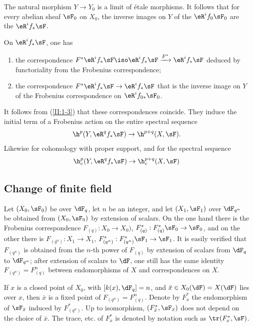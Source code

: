 \documentclass[oneside]{book}
\begin{document}
The natural morphism $Y\to Y_0$ is a limit of étale morphisms. It follows
that for every abelian sheaf $\sF_0$ on $X_0$, the inverse images on $Y$ of
the $\eR^if_0\sF_0$ are the $\eR^if_*\sF$.

On $\eR^if_*\sF$, one has
\begin{enumerate}[\indent a)]
  \item the correspondence
    $F^*\eR^i f_*\sF \iso \eR^i f_*\sF \xrightarrow{F^*} \eR^if_*\sF$
    deduced by functoriality from the Frobenius correspondence;
  \item the correspondence $F^*\eR^if_*\sF\to\eR^if_*\sF$ that is the
    inverse image on $Y$ of the Frobenius correspondence on
    $\eR^i f_{0*}\sF_0$.
\end{enumerate}

It follows from (\ref{II:1-3}) that these correspondences coincide. They
induce the initial term of a Frobenius action on the entire spectral sequence
\[
  \h^p(Y,\eR^q f_*\sF) \rightarrow \h^{p+q}(X,\sF) \text{.}
\]
Likewise for cohomology with proper support, and for the spectral sequence
\[
  \h_c^p(Y,\eR^q f_* \sF) \rightarrow \h_c^{p+q}(X,\sF)
\]





\subsection{Change of finite field}\label{II:1-5}

Let $(X_0,\sF_0)$ be over $\dF_q$, let $n$ be an integer, and let
$(X_1,\sF_1)$ over $\dF_{q^n}$ be obtained from $(X_0,\sF_0)$ by extension of
scalars. On the one hand there is the Frobenius correspondence
$F_{(q)}:X_0\to X_0)$, $F_{(q)}^*:F_{(q)}^*\sF_0\to \sF_0$, and on the other
there is $F_{(q^n)}:X_1\to X_1$,
$F_{(q^n)}^*:F_{(q^n)}^*\sF_1\to\sF_1$. It is easily verified that
$F_{(q^n)}$ is obtained from the $n$-th power of $F_{(q)}$ by extension of
scalars from $\dF_q$ to $\dF_{q^n}$; after extension of scalars to $\dF$, one
still has the same identity $F_{(q^n)}=F_{(q)}^n$ between endomorphisms of
$X$ and correspondences on $X$.

If $x$ is a closed point of $X_0$, with $[k(x),\dF_q]=n$, and
$\bar x\in X_0(\dF) = X(\dF)$ lies over $x$, then $\bar x$ is a fixed point
of $F_{(q^n)}=F_{(q)}^n$. Denote by $F_x^*$ the endomorphism of
$\sF_{\bar x}$ induced by $F_{(q^n)}^*$. Up to isomorphism,
$(F_{\bar x}^*,\sF_{\bar x})$ does not depend on the choice of $\bar x$.
The trace, etc. of $F_x^*$ is denoted by notation such as
$\tr(F_x^*,\sF)$.
\end{document}
